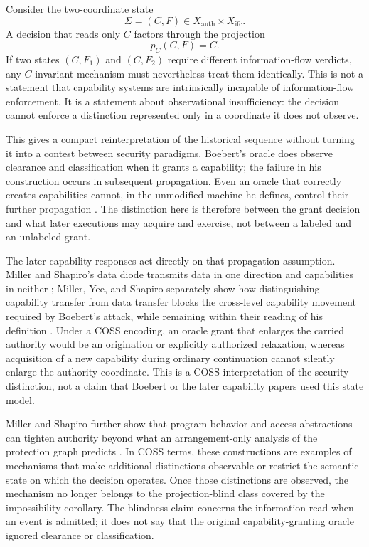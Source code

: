 \documentclass[10pt,twocolumn]{article}
\newcommand{\Model}{\textnormal{\textsc{COSS}}\xspace}
\newcommand{\state}{\Sigma}
\begin{document}
Consider the two-coordinate state
\begin{equation}
  \state=(C,F)
  \in X_{\mathrm{auth}}\times X_{\mathrm{ifc}}.
\end{equation}
A decision that reads only $C$ factors through the projection
\begin{equation}
  p_C(C,F)=C.
\end{equation}
If two states $(C,F_1)$ and $(C,F_2)$ require different information-flow
verdicts, any $C$-invariant mechanism must nevertheless treat them identically.
This is not a statement that capability systems are intrinsically incapable of
information-flow enforcement.  It is a statement about observational
insufficiency: the decision cannot enforce a distinction represented only in a
coordinate it does not observe.

This gives a compact reinterpretation of the historical sequence without
turning it into a contest between security paradigms.  Boebert's oracle does
observe clearance and classification when it grants a capability; the failure
in his construction occurs in subsequent propagation.  Even an oracle that
correctly creates capabilities cannot, in the unmodified machine he defines,
control their further propagation \cite{boebert1984}.  The distinction here is
therefore between the grant decision and what later executions may acquire and
exercise, not between a labeled and an unlabeled grant.

The later capability responses act directly on that propagation assumption.
Miller and Shapiro's data diode transmits data in one direction and capabilities
in neither \cite{miller_shapiro2003}; Miller, Yee, and Shapiro separately show
how distinguishing capability transfer from data transfer blocks the cross-level
capability movement required by Boebert's attack, while remaining within their
reading of his definition \cite{miller_yee_shapiro2003}.  Under a \Model
encoding, an oracle grant that enlarges the carried authority would be an
origination or explicitly authorized relaxation, whereas acquisition of a new
capability during ordinary continuation cannot silently enlarge the authority
coordinate.  This is a \Model interpretation of the security distinction, not
a claim that Boebert or the later capability papers used this state model.

Miller and Shapiro further show that program behavior and access abstractions can
tighten authority beyond what an arrangement-only analysis of the protection
graph predicts \cite{miller_shapiro2003}.  In \Model terms, these constructions
are examples of mechanisms that make additional distinctions observable or
restrict the semantic state on which the decision operates.  Once those
distinctions are observed, the mechanism no longer belongs to the
projection-blind class covered by the impossibility corollary.  The blindness
claim concerns the information read when an event is admitted; it does not say
that the original capability-granting oracle ignored clearance or
classification.
\end{document}
